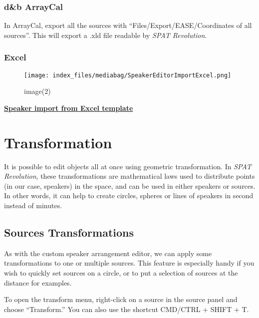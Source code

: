 \documentclass[
  letterpaper,
  DIV=11,
  numbers=noendperiod]{scrreport}
\begin{document}
\hypertarget{db-arraycal}{%
\subsection{d\&b ArrayCal}\label{db-arraycal}}

In ArrayCal, export all the sources with ``Files/Export/EASE/Coordinates
of all sources''. This will export a .xld file readable by \emph{SPAT
Revolution}.

\hypertarget{excel}{%
\subsection{Excel}\label{excel}}

\begin{figure}

{\centering \texttt{[image: index\_files/mediabag/SpeakerEditorImportExcel.png]}

}

\caption{image(2)}

\end{figure}

\textbf{\href{https://public.3.basecamp.com/p/w1VQL9UbbndSXP5P3qpU6DnU}{Speaker
import from Excel template}}

\hypertarget{transformation}{%
\chapter{Transformation}\label{transformation}}

It is possible to edit objects all at once using geometric
transformation. In \emph{SPAT Revolution}, these transformations are
mathematical laws used to distribute points (in our case, speakers) in
the space, and can be used in either speakers or sources. In other
words, it can help to create circles, spheres or lines of speakers in
second instead of minutes.

\hypertarget{sources-transformations}{%
\section{Sources Transformations}\label{sources-transformations}}

As with the custom speaker arrangement editor, we can apply some
transformations to one or multiple sources. This feature is especially
handy if you wish to quickly set sources on a circle, or to put a
selection of sources at the distance for examples.

To open the transform menu, right-click on a source in the source panel
and choose ``Transform.'' You can also use the shortcut CMD/CTRL + SHIFT
+ T.
\end{document}
